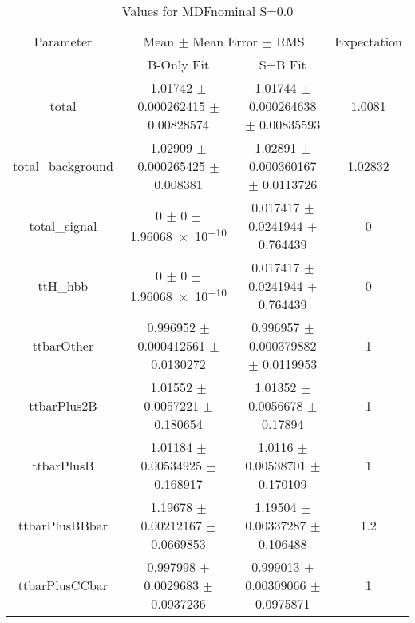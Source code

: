 \begin{table}
\centering
\caption{Values for MDFnominal S=0.0}
\begin{tabular}{cccc}
\toprule
Parameter & \multicolumn{2}{c}{Mean $\pm$ Mean Error $\pm$ RMS} & Expectation\\
 & B-Only Fit & S+B Fit & \\
\midrule
total & \num{1.01742} $\pm$ \num{0.000262415} $\pm$ \num{0.00828574} & \num{1.01744} $\pm$ \num{0.000264638} $\pm$ \num{0.00835593} & \num{1.0081}\\
total\_background & \num{1.02909} $\pm$ \num{0.000265425} $\pm$ \num{0.008381} & \num{1.02891} $\pm$ \num{0.000360167} $\pm$ \num{0.0113726} & \num{1.02832}\\
total\_signal & \num{0} $\pm$ \num{0} $\pm$ \num{1.96068e-10} & \num{0.017417} $\pm$ \num{0.0241944} $\pm$ \num{0.764439} & \num{0}\\
ttH\_hbb & \num{0} $\pm$ \num{0} $\pm$ \num{1.96068e-10} & \num{0.017417} $\pm$ \num{0.0241944} $\pm$ \num{0.764439} & \num{0}\\
ttbarOther & \num{0.996952} $\pm$ \num{0.000412561} $\pm$ \num{0.0130272} & \num{0.996957} $\pm$ \num{0.000379882} $\pm$ \num{0.0119953} & \num{1}\\
ttbarPlus2B & \num{1.01552} $\pm$ \num{0.0057221} $\pm$ \num{0.180654} & \num{1.01352} $\pm$ \num{0.0056678} $\pm$ \num{0.17894} & \num{1}\\
ttbarPlusB & \num{1.01184} $\pm$ \num{0.00534925} $\pm$ \num{0.168917} & \num{1.0116} $\pm$ \num{0.00538701} $\pm$ \num{0.170109} & \num{1}\\
ttbarPlusBBbar & \num{1.19678} $\pm$ \num{0.00212167} $\pm$ \num{0.0669853} & \num{1.19504} $\pm$ \num{0.00337287} $\pm$ \num{0.106488} & \num{1.2}\\
ttbarPlusCCbar & \num{0.997998} $\pm$ \num{0.0029683} $\pm$ \num{0.0937236} & \num{0.999013} $\pm$ \num{0.00309066} $\pm$ \num{0.0975871} & \num{1}\\
\bottomrule
\end{tabular}
\end{table}